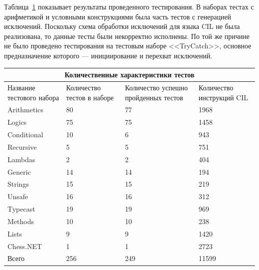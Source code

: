 Таблица~\ref{experiments} показывает результаты проведенного тестирования. 
В наборах тестах с арифметикой и условными конструкциями была часть тестов с генерацией исключений. 
Поскольку схема обработки исключений для языка CIL не была реализована, то данные тесты были некорректно исполнены.
По той же причине не было проведено тестирования на тестовым наборе <<TryCatch>>, 
основное предназначение которого --- инициирование и перехват исключений.

\begin{table}[H]
    \centering
    \begin{tabular}{ |p{3cm}||p{2cm}|p{2cm}|p{2cm}|  }
        \hline
        \multicolumn{4}{|c|}{Количественные характеристики тестов} \\
        \hline
        Название тестового набора &Количество тестов в наборе&Количество успешно пройденных тестов&Количество инструкций CIL\\
        \hline
        Arithmetics   &80    &77    &1968\\
        Logics        &75    &75    &1458\\
        Conditional   &10    &6     &943\\
        Recursive     &5     &5     &751\\
        Lambdas       &2     &2     &404\\
        Generic       &14    &14    &194\\
        Strings       &15    &15    &219\\
        Unsafe        &16    &16    &312\\
        Typecast      &19    &19    &969\\
        Methods       &10    &10    &238\\
        Lists         &9     &9     &1420\\
        Chess.NET     &1     &1     &2723\\
        \hline
        Всего         &256   &249   &11599\\
        \hline
    \end{tabular}
    \label{experiments}
\end{table}